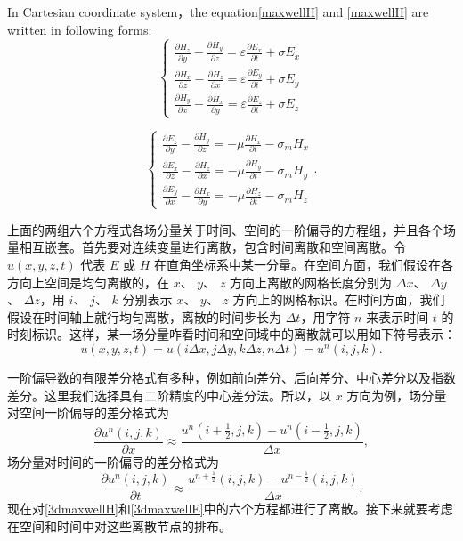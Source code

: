 In  Cartesian coordinate system，the equation\eqref{maxwellH} and \eqref{maxwellH} are written in following forms:
\begin{equation}\label{3dmaxwellE}
\begin{cases}
\frac{\partial H_z}{\partial y}-\frac{\partial H_y}{\partial z}=\varepsilon\frac{\partial E_x}{\partial t}+\sigma E_x\\
\frac{\partial H_x}{\partial z}-\frac{\partial H_z}{\partial x}=\varepsilon\frac{\partial E_y}{\partial t}+\sigma E_y\\
\frac{\partial H_y}{\partial x}-\frac{\partial H_x}{\partial y}=\varepsilon\frac{\partial E_z}{\partial t}+\sigma E_z
\end{cases}
\end{equation}

\begin{equation}\label{3dmaxwellH}
\begin{cases}
\frac{\partial E_z}{\partial y}-\frac{\partial H_y}{\partial z}=-\mu\frac{\partial H_x}{\partial t}-\sigma_m H_x\\
\frac{\partial E_x}{\partial z}-\frac{\partial H_z}{\partial x}=-\mu\frac{\partial H_y}{\partial t}-\sigma_m H_y\\
\frac{\partial E_y}{\partial x}-\frac{\partial H_x}{\partial y}=-\mu\frac{\partial H_z}{\partial t}-\sigma_m H_z
\end{cases}.
\end{equation}

上面的两组六个方程式各场分量关于时间、空间的一阶偏导的方程组，并且各个场量相互嵌套。首先要对连续变量进行离散，包含时间离散和空间离散。令 $u(x,y,z,t)$ 代表 $\mathbf{\mathit{E}}$ 或 $\mathbf{\mathit{H}}$ 在直角坐标系中某一分量。在空间方面，我们假设在各方向上空间是均匀离散的，在 $x$、 $y$、 $z$ 方向上离散的网格长度分别为 $\Delta x$、 $\Delta y$、 $\Delta z$，用 $i$、 $j$、 $k$ 分别表示 $x$、 $y$、 $z$ 方向上的网格标识。在时间方面，我们假设在时间轴上就行均匀离散，离散的时间步长为 $\Delta t$，用字符 $n$ 来表示时间 $t$ 的时刻标识。这样，某一场分量咋看时间和空间域中的离散就可以用如下符号表示：
\begin{equation}
u(x,y,z,t)=u(i\Delta x,j\Delta y,k\Delta z,n\Delta t)=u^n(i,j,k).
\end{equation}

一阶偏导数的有限差分格式有多种，例如前向差分、后向差分、中心差分以及指数差分。这里我们选择具有二阶精度的中心差分法。所以，以 $x$ 方向为例，场分量对空间一阶偏导的差分格式为
\begin{equation}\label{space discrete}
\frac{\partial u^n(i,j,k)}{\partial x} \approx \frac{
	u^n(i+\frac{1}{2},j,k)-u^n(i-\frac{1}{2},j,k)
	}{\Delta x},
\end{equation}
场分量对时间的一阶偏导的差分格式为
\begin{equation}\label{time discrete}
\frac{\partial u^n(i,j,k)}{\partial t} \approx \frac{
	u^{n+\frac{1}{2}}(i,j,k)-u^{n-\frac{1}{2}}(i,j,k)
}{\Delta x}.
\end{equation}
现在对\eqref{3dmaxwellH}和\eqref{3dmaxwellE}中的六个方程都进行了离散。接下来就要考虑在空间和时间中对这些离散节点的排布。

